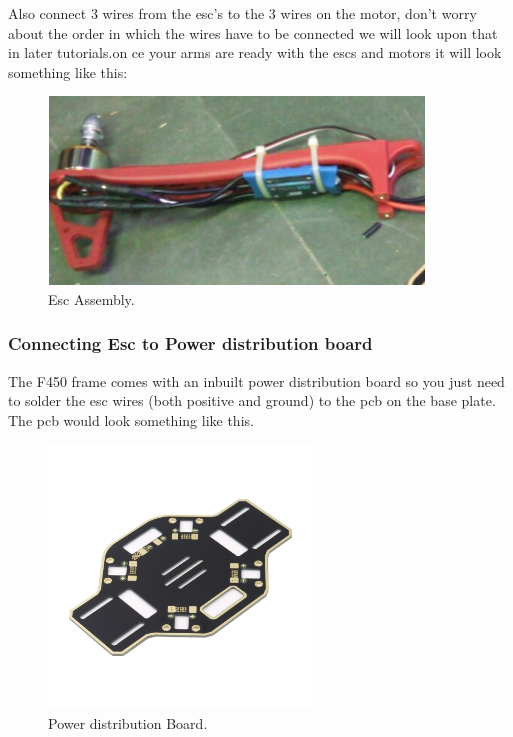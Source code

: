 \documentclass[a4paper,12pt,oneside]{book}
\begin{document}
	 	 Also connect 3 wires from the esc's to the 3 wires on the motor, don't worry about the order in which the wires have to be connected we will look upon that in later tutorials.on ce your arms are ready with the escs and motors it will look something like this:
	 	 \begin{figure}[H]
	 	
	 	\centering
		\includegraphics[width=10cm,height=5cm]{Esc}
		\caption{Esc Assembly.}
		\end{figure}
		
		\subsubsection{Connecting Esc to Power distribution board}
		The F450 frame comes with an inbuilt power distribution board so you just need to solder the esc wires (both positive and ground) to the pcb on the base plate. The pcb would look something like this.
		\begin{figure}[H]
	 	
	 	\centering
		\includegraphics[width=7cm,height=7cm]{pcb}
		\caption{Power distribution Board.}
		\end{figure}
		
\end{document}
